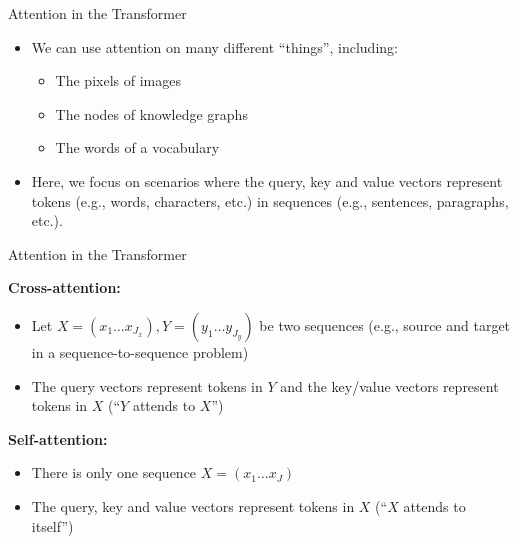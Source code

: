 \begin{vbframe}{Attention in the Transformer}

\vfill

\begin{itemize}
\item We can use attention on many different ``things'', including: 
\begin{itemize}
\item The pixels of images
\item The nodes of knowledge graphs
\item The words of a vocabulary
\end{itemize}
\item Here, we focus on scenarios where the query, key and value vectors represent tokens (e.g., words, characters, etc.) in sequences (e.g., sentences, paragraphs, etc.).
\end{itemize}

\vfill

\end{vbframe}


\begin{vbframe}{Attention in the Transformer}

\vfill

\textbf{Cross-attention:}
\begin{itemize}
\item Let $X = (x_1 \ldots x_{J_x}), Y = (y_1 \ldots y_{J_y})$ be two sequences (e.g., source and target in a sequence-to-sequence problem)
\item The query vectors represent tokens in $Y$ and the key/value vectors represent tokens in $X$ (``$Y$ attends to $X$'')
\end{itemize}
\textbf{Self-attention:}
\begin{itemize}
\item There is only one sequence $X = (x_1 \ldots x_J)$
\item The query, key and value vectors represent tokens in $X$ (``$X$ attends to itself'')
\end{itemize}

\vfill

\end{vbframe}


